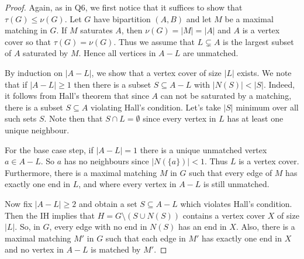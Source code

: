 \documentclass{article}
\begin{document}
\begin{proof}
Again, as in Q6, we first notice that it suffices to show that \( \tau (G) \leq \nu (G) \). Let \( G \) have bipartition \( (A,B) \) and let \( M \) be a maximal matching in \( G \). If \( M \) saturates \( A \), then \( \nu (G) = |M| = |A| \) and \( A \) is a vertex cover so that \( \tau (G) = \nu (G) \). Thus we assume that \( L \subsetneq A \) is the largest subset of \( A \) saturated by \( M \). Hence all vertices in \( A - L\) are unmatched. 

By induction on \( |A - L| \), we show that a vertex cover of size \( |L| \) exists. We note that if \( |A - L| \geq 1 \) then there is a subset \( S \subseteq A - L \) with \( |N(S)| < |S| \). Indeed, it follows from Hall's theorem that since \( A \) can not be saturated by a matching, there is a subset \( S \subseteq A \) violating Hall's condition. Let's take \( |S| \) minimum over all such sets \( S \). Note then that \( S \cap L = \emptyset  \) since every vertex in \( L \) has at least one unique neighbour.

For the base case step, if \( |A - L| = 1 \) there is a unique unmatched vertex \( a \in A - L \). So \( a \) has no neighbours since \( |N(\{ a \})| < 1 \). Thus \( L \) is a vertex cover. Furthermore, there is a maximal matching \( M \) in \( G \) such that every edge of \( M \) has exactly one end in \( L \), and where every vertex in \( A - L \) is still unmatched.

Now fix \( |A - L| \geq 2 \) and obtain a set \( S \subseteq A - L \) which violates Hall's condition. Then the IH implies that \( H = G \setminus (S \cup N(S)) \) contains a vertex cover \( X \) of size \( |L| \). So, in \( G \), every edge with no end in \( N(S) \) has an end in \( X \). Also, there is a maximal matching \( M' \) in \( G \) such that each edge in \( M' \) has exactly one end in \( X \) and no vertex in \( A - L \) is matched by \( M' \).


\end{proof}
\end{document}
